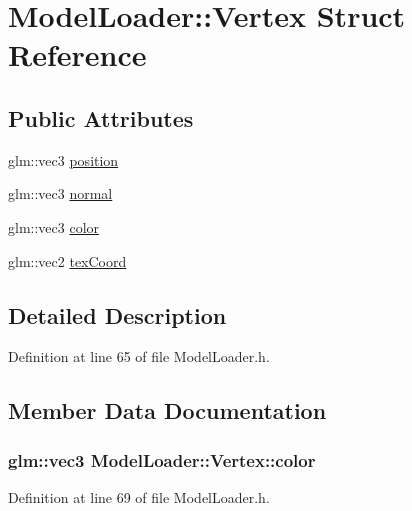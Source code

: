 \hypertarget{struct_model_loader_1_1_vertex}{}\section{Model\+Loader\+:\+:Vertex Struct Reference}
\label{struct_model_loader_1_1_vertex}
\subsection*{Public Attributes}
\begin{DoxyCompactItemize}
\item 
glm\+::vec3 \hyperlink{struct_model_loader_1_1_vertex_a78385e6b324c9f786e7f4e14263ca026}{position}
\item 
glm\+::vec3 \hyperlink{struct_model_loader_1_1_vertex_a0d1ac4c30a3a1e4645ea14332d86b035}{normal}
\item 
glm\+::vec3 \hyperlink{struct_model_loader_1_1_vertex_a4cecec2539987da6dfb1a325baf9ae16}{color}
\item 
glm\+::vec2 \hyperlink{struct_model_loader_1_1_vertex_a8821e887b456902f93bf0e16f58a72db}{tex\+Coord}
\end{DoxyCompactItemize}


\subsection{Detailed Description}


Definition at line 65 of file Model\+Loader.\+h.



\subsection{Member Data Documentation}
\subsubsection[{\texorpdfstring{color}{color}}]{\setlength{\rightskip}{0pt plus 5cm}glm\+::vec3 Model\+Loader\+::\+Vertex\+::color}\hypertarget{struct_model_loader_1_1_vertex_a4cecec2539987da6dfb1a325baf9ae16}{}\label{struct_model_loader_1_1_vertex_a4cecec2539987da6dfb1a325baf9ae16}


Definition at line 69 of file Model\+Loader.\+h.



